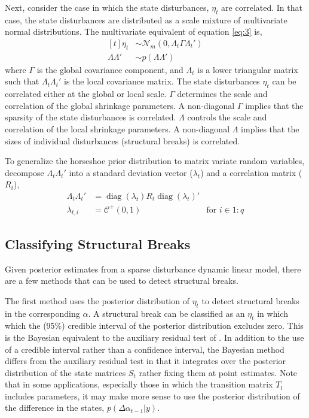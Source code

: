 \documentclass{article}
\newcommand{\dist}[1]{\mathcal{#1}}
\newcommand{\paren}[1]{\ensuremath{\left(#1\right)}}
\newcommand{\dmvnorm}[2]{\ensuremath{\dist{N}_{#2}\paren{#1}}}
\newcommand{\dhalfcauchy}[1]{\ensuremath{\dist{C}^{+}\paren{#1}}}
\DeclareMathOperator{\diag}{diag}
\begin{document}
Next, consider the case in which the state disturbances, $\eta_{t}$ are correlated.
In that case, the state disturbances are distributed as a scale mixture of multivariate normal distributions.
The multivariate equivalent of equation \eqref{eq:3} is,
\begin{equation}
  \begin{aligned}[t]
    \eta_{t} &\sim \dmvnorm{0, \Lambda_{t} \Gamma \Lambda_{t}'}{m} \\
    \Lambda \Lambda' & \sim p(\Lambda \Lambda')
  \end{aligned}
\end{equation}
where $\Gamma$ is the global covariance component, and $\Lambda_{t}$ is a lower triangular matrix such that  $\Lambda_{t} \Lambda_{t}'$ is the local covariance matrix.
The state disturbances $\eta_{t}$ can be correlated either at the global or local scale.
$\Gamma$ determines the scale and correlation of the global shrinkage parameters.
A non-diagonal $\Gamma$ implies that the sparsity of the state disturbances is correlated.
$\Lambda$ controls the scale and correlation of the local shrinkage parameters.
A non-diagonal $\Lambda$ implies that the sizes of individual disturbances (structural breaks) is correlated.

To generalize the horseshoe prior distribution to matrix variate random variables, decompose $\Lambda_{t} \Lambda_{t}'$ into a standard deviation vector ($\lambda_{t}$) and a correlation matrix ($R_{t}$),%
\begin{align}
  \label{eq:16}
  \Lambda_{t} \Lambda_{t}' &= \diag(\lambda_{t}) R_{t} \diag(\lambda_{t})' \\
  \label{eq:17}
  \lambda_{t,i} &= \dhalfcauchy{0, 1} & \text{for $i \in 1:q$}
\end{align}

\subsection{Classifying Structural Breaks}
\label{sec:structural-breaks}

Given posterior estimates from a sparse disturbance dynamic linear model, there are a few methods that can be used to detect structural breaks.

The first method uses the posterior distribution of $\eta_{t}$ to detect structural breaks in the corresponding $\alpha$.
A structural break can be classified as an $\eta_{t}$ in which which the (95\%) credible interval of the posterior distribution excludes zero.
This is the Bayesian equivalent to the auxiliary residual test of \textcites{JongPenzer1998}{DurbinKoopman2001}.%
In addition to the use of a credible interval rather than a confidence interval, the Bayesian method differs from the auxiliary residual test in that it integrates over the posterior distribution of the state matrices $S_{t}$ rather fixing them at point estimates.
Note that in some applications, especially those in which the transition matrix $T_{t}$ includes parameters, it may make more sense to use the posterior distribution of the difference in the states, $p(\Delta \alpha_{t - 1} | y)$.
\end{document}
